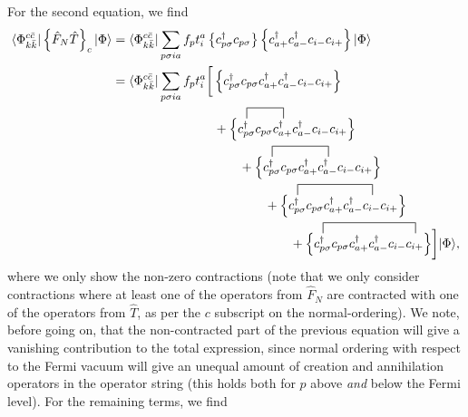\documentclass[a4paper]{article}
\newcommand{\nn}{\nonumber}
\newcommand{\ps}{{p\sigma}}
\begin{document}
For the second equation, we find 
\begin{align}
\langle \Phi_{k\bar k}^{c\bar c}|\left\{\hat F_N \hat T  \right\}_c |\Phi\rangle &= \langle \Phi_{k\bar k}^{c\bar c}| \sum_{\ps ia} f_p t_i^a \left\{ c_\ps^\dagger c_\ps \right\}\left\{ c_{a+}^\dagger c_{a-}^\dagger c_{i-} c_{i+} \right\} | \Phi\rangle \nn\\
%
&= \langle \Phi_{k\bar k}^{c\bar c}| \sum_{\ps ia} f_p t_i^a \bigg[\left\{ c_\ps^\dagger c_\ps  c_{a+}^\dagger c_{a-}^\dagger c_{i-} c_{i+} \right\} \nn\\
%
& \ \ \ \ \ \  \ \ \ \ \ \  \ \ \ \ \ \  \ \ \ \ \ \   +\Big\{ \contraction[2ex]{}{c_\ps^\dagger}{c_\ps}{c_{a+}^\dagger}c_\ps^\dagger c_\ps  c_{a+}^\dagger c_{a-}^\dagger c_{i-} c_{i+} \Big\}  \nn\\
%
& \ \ \ \ \ \  \ \ \ \ \ \  \ \ \ \ \ \  \ \ \ \ \ \  \ \ \ \ \ \ +\Big\{ \contraction[2ex]{}{c_\ps^\dagger}{c_\ps c_{a+}^\dagger}{c_{a-}^\dagger}c_\ps^\dagger c_\ps  c_{a+}^\dagger c_{a-}^\dagger c_{i-} c_{i+} \Big\}  \nn\\
%
& \ \ \ \ \ \  \ \ \ \ \ \  \ \ \ \ \ \  \ \ \ \ \ \  \ \ \ \ \ \ \ \ \ \ \ \ +\Big\{ \contraction[2ex]{}{c_\ps^\dagger}{c_\ps c_{a+}^\dagger c_{a-}^\dagger}{c_{i-}}c_\ps^\dagger c_\ps  c_{a+}^\dagger c_{a-}^\dagger c_{i-} c_{i+} \Big\} \nn\\
%
& \ \ \ \ \ \  \ \ \ \ \ \  \ \ \ \ \ \  \ \ \ \ \ \  \ \ \ \ \ \ \ \ \ \ \ \ \ \ \ \ \ \ +\Big\{ \contraction[2ex]{}{c_\ps^\dagger}{c_\ps c_{a+}^\dagger c_{a-}^\dagger c_{i-}}{c_{i+}}c_\ps^\dagger c_\ps  c_{a+}^\dagger c_{a-}^\dagger c_{i-} c_{i+} \Big\} \bigg] | \Phi\rangle,
\end{align}
where we only show the non-zero contractions (note that we only consider contractions where at least one of the operators from $\hat F_N$ are contracted with one of the operators from $\hat T$, as per the $c$ subscript on the normal-ordering). We note, before going on, that the non-contracted part of the previous equation will give a vanishing contribution to the total expression, since normal ordering with respect to the Fermi vacuum will give an unequal amount of creation and annihilation operators in the operator string (this holds both for $p$ above \emph{and} below the Fermi level). For the remaining terms, we find
\end{document}
